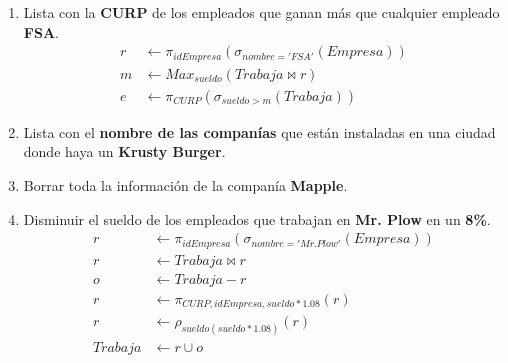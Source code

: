\documentclass{article}
\begin{document}
\begin{enumerate}
{{\begin{enumerate}
{\begin{align*}
                            p &\leftarrow \pi_{idEmpresa}(\sigma_{nombre = 'FSA'}(Empresa)) \\
                            p &\leftarrow \pi_{CURP}(Trabaja \bowtie p) \\
                            r &\leftarrow r - p \\
                            r &\leftarrow pi_{nombre}(r \bowtie Empleado)
                        \end{align*}
                    }
                    \item {
                        Lista con la \textbf{CURP} de los empleados que ganan
                        más que cualquier empleado \textbf{FSA}.
                        \begin{align*}
                            r &\leftarrow \pi_{idEmpresa}(\sigma_{nombre = 'FSA'}(Empresa)) \\
                            m &\leftarrow Max_{sueldo}(Trabaja \bowtie r) \\
                            e &\leftarrow \pi_{CURP}(\sigma_{sueldo>m}(Trabaja))
                        \end{align*}
                    }
                    \item {
                        Lista con el \textbf{nombre de las companías} que están
                        instaladas en una ciudad donde haya un
                        \textbf{Krusty Burger}.
                    }
                    \item {
                        Borrar toda la información de la companía
                        \textbf{Mapple}.
                    }
                    \item {
                        Disminuir el sueldo de los empleados que trabajan en
                        \textbf{Mr. Plow} en un \textbf{8\%}.
                        \begin{align*}
                            r &\leftarrow \pi_{idEmpresa}(\sigma_{nombre = 'Mr. Plow'}(Empresa)) \\
                            r &\leftarrow Trabaja \bowtie r \\
                            o &\leftarrow Trabaja - r \\
                            r &\leftarrow \pi_{CURP, idEmpresa, sueldo*1.08}(r)\\
                            r &\leftarrow \rho_{sueldo(sueldo*1.08)}(r)\\
                            Trabaja &\leftarrow r \cup o

\end{align*}}
\end{enumerate}}}
\end{enumerate}
\end{document}
